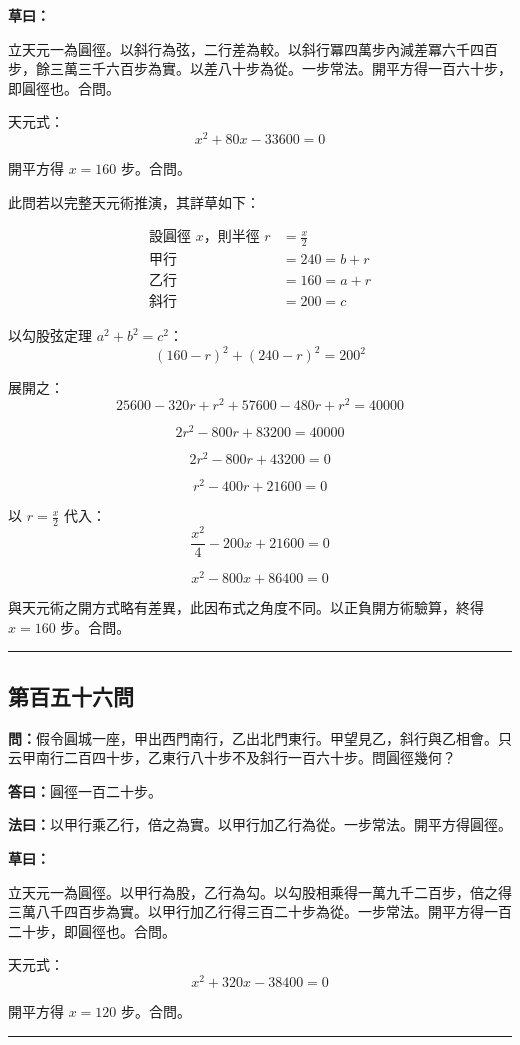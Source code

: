 \documentclass[11pt,a4paper]{article}
\newcommand{\longline}{\noindent\rule{\textwidth}{0.4pt}}
\newcommand{\wen}[1]{\par\noindent\textbf{\textcolor{probcolor}{問：}}{#1}\par}
\newcommand{\da}[1]{\par\noindent\textbf{\textcolor{anscolor}{答曰：}}{#1}\par}
\newcommand{\fayue}[1]{\par\noindent\textbf{\textcolor{methodcolor}{法曰：}}{#1}\par}
\newcommand{\caoyue}[1]{\par\noindent\textbf{草曰：}{#1}\par}
\begin{document}
\caoyue{
立天元一為圓徑。以斜行為弦，二行差為較。以斜行冪四萬步內減差冪六千四百步，餘三萬三千六百步為實。以差八十步為從。一步常法。開平方得一百六十步，即圓徑也。合問。

天元式：
$$x^2 + 80x - 33600 = 0$$

開平方得 $x = 160$ 步。合問。

此問若以完整天元術推演，其詳草如下：

\begin{align*}
\text{設圓徑 } x \text{，則半徑 } r &= \frac{x}{2} \\
\text{甲行} &= 240 = b + r \\
\text{乙行} &= 160 = a + r \\
\text{斜行} &= 200 = c
\end{align*}

以勾股弦定理 $a^2 + b^2 = c^2$：
$$(160 - r)^2 + (240 - r)^2 = 200^2$$

展開之：
$$25600 - 320r + r^2 + 57600 - 480r + r^2 = 40000$$

$$2r^2 - 800r + 83200 = 40000$$

$$2r^2 - 800r + 43200 = 0$$

$$r^2 - 400r + 21600 = 0$$

以 $r = \frac{x}{2}$ 代入：
$$\frac{x^2}{4} - 200x + 21600 = 0$$

$$x^2 - 800x + 86400 = 0$$

與天元術之開方式略有差異，此因布式之角度不同。以正負開方術驗算，終得 $x = 160$ 步。合問。
}

\vspace{0.5cm}
\longline

\subsection*{第百五十六問}
\wen{假令圓城一座，甲出西門南行，乙出北門東行。甲望見乙，斜行與乙相會。只云甲南行二百四十步，乙東行八十步不及斜行一百六十步。問圓徑幾何？}

\da{圓徑一百二十步。}

\fayue{以甲行乘乙行，倍之為實。以甲行加乙行為從。一步常法。開平方得圓徑。}

\caoyue{
立天元一為圓徑。以甲行為股，乙行為勾。以勾股相乘得一萬九千二百步，倍之得三萬八千四百步為實。以甲行加乙行得三百二十步為從。一步常法。開平方得一百二十步，即圓徑也。合問。

天元式：
$$x^2 + 320x - 38400 = 0$$

開平方得 $x = 120$ 步。合問。
}

\vspace{0.5cm}
\longline
\end{document}
